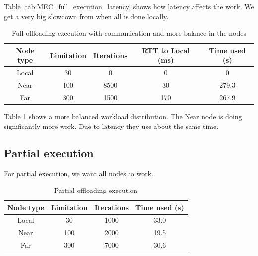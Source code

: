 Table \ref{tab:MEC_full_execution_latency} shows how latency affects the work. We get a very big slowdown from when all is done locally. 

\begin{table}[h!]
    \centering
    \begin{tabular}[c]{|c|c|c|c|c|}
        \hline
        Node type & Limitation & Iterations & RTT to Local (ms)& Time used (s)\\
        \hline
        \hline
        Local & 30 & 0 & 0 & 0 \\
        \hline
        Near & 100 & 8500 & 30 & 279.3 \\
        \hline
        Far & 300 & 1500 & 170 & 267.9 \\
        \hline
    \end{tabular}
    \caption{Full offloading execution with communication and more balance in the nodes}
    \label{tab:MEC_full_execution_latency_balance}
\end{table}

Table \ref{tab:MEC_full_execution_latency_balance} shows a more balanced workload distribution. The Near node is doing significantly more work. Due to latency they use about the same time.















\subsection{Partial execution}
For partial execution, we want all nodes to work.
\begin{table}[h!]
    \centering
    \begin{tabular}[c]{|c|c|c|c|}
        \hline
        Node type & Limitation & Iterations & Time used (s)\\
        \hline
        \hline
        Local & 30 & 1000 & 33.0 \\
        \hline
        Near & 100 & 2000 & 19.5 \\
        \hline
        Far & 300 & 7000 & 30.6 \\
        \hline
    \end{tabular}
    \caption{Partial offloading execution}
    \label{tab:MEC_partial_execution}
\end{table}


